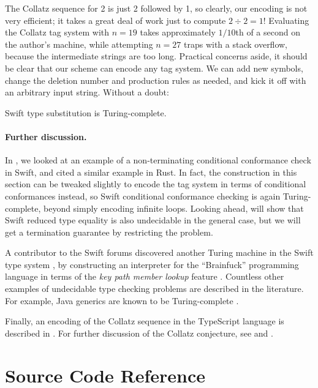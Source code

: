 \documentclass[../generics]{subfiles}
\begin{document}
The Collatz sequence for 2 is just 2 followed by 1, so clearly, our encoding is not very efficient; it takes a great deal of work just to compute $2\div 2 = 1$! Evaluating the Collatz tag system with $n=19$ takes approximately $1/10$th of a second on the author's machine, while attempting $n=27$ traps with a stack overflow, because the intermediate strings are too long. Practical concerns aside, it should be clear that our scheme can encode any tag system. We can add new symbols, change the deletion number and production rules as needed, and kick it off with an arbitrary input string. Without a doubt:

\begin{theorem}
Swift type substitution is Turing-complete.
\end{theorem}

\paragraph{Further discussion.}
In , we looked at an example of a non-terminating conditional conformance check in Swift, and cited a similar example in Rust. In fact, the construction in this section can be tweaked slightly to encode the tag system in terms of conditional conformances instead, so Swift conditional conformance checking is again Turing-complete, beyond simply encoding infinite loops. Looking ahead,  will show that Swift reduced type equality is also undecidable in the general case, but we will get a termination guarantee by restricting the problem.

A contributor to the Swift forums discovered another Turing machine in the Swift type system \cite{brainfuck}, by constructing an interpreter for the ``Brainfuck'' programming language in terms of the \emph{key path member lookup} feature \cite{se0252}. Countless other examples of undecidable type checking problems are described in the literature. For example, Java generics are known to be Turing-complete \cite{java_wildcards,java_undecidable}.

Finally, an encoding of the Collatz sequence in the TypeScript language is described in \cite{tscollatz}. For further discussion of the Collatz conjecture, see \cite{collatzbook} and \cite{wolframtag}.

\section{Source Code Reference}
\end{document}
